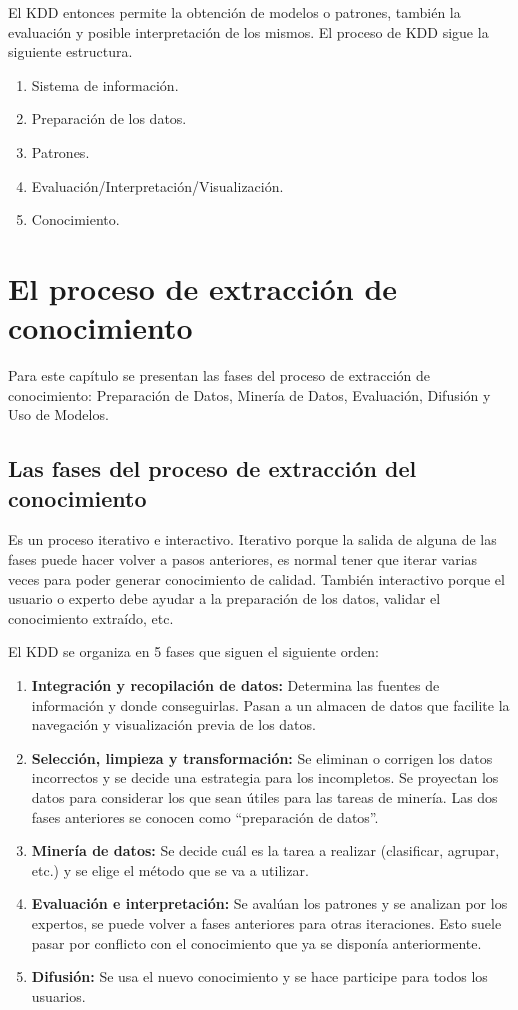 \documentclass{article}
\begin{document}
El KDD entonces permite la obtención de modelos o patrones, también la
evaluación y posible interpretación de los mismos. El proceso de KDD sigue la
siguiente
estructura.

\begin{enumerate}
  \item Sistema de información.
  \item Preparación de los datos.
  \item Patrones.
  \item Evaluación/Interpretación/Visualización.
  \item Conocimiento.
\end{enumerate}

\newpage

\section{El proceso de extracción de conocimiento}
Para este capítulo se presentan las fases del proceso de extracción de conocimiento: Preparación de Datos, Minería de Datos, Evaluación, Difusión y Uso de Modelos.

\subsection{Las fases del proceso de extracción del conocimiento}

Es un proceso iterativo e interactivo. Iterativo porque la salida de alguna de las fases puede hacer volver a pasos anteriores, es normal tener que iterar varias veces para poder generar conocimiento de calidad. También interactivo porque el usuario o experto debe ayudar a la preparación de los datos, validar el conocimiento extraído, etc.

El KDD se organiza en 5 fases que siguen el siguiente orden:
\begin{enumerate}
  \item \textbf{Integración y recopilación de datos:} Determina las fuentes de información y donde conseguirlas. Pasan a un almacen de datos que facilite la navegación y visualización previa de los datos.
  \item \textbf{Selección, limpieza y transformación:} Se eliminan o corrigen los datos incorrectos y se decide una estrategia para los incompletos. Se proyectan los datos para considerar los que sean útiles para las tareas de minería. Las dos fases anteriores se conocen como ``preparación de datos''.
  \item \textbf{Minería de datos:} Se decide cuál es la tarea a realizar (clasificar, agrupar, etc.) y se elige el método que se va a utilizar.
  \item \textbf{Evaluación e interpretación:} Se avalúan los patrones y se analizan por los expertos, se puede volver a fases anteriores para otras iteraciones. Esto suele pasar por conflicto con el conocimiento que ya se disponía anteriormente.
  \item \textbf{Difusión:} Se usa el nuevo conocimiento y se hace participe para todos los usuarios.
\end{enumerate}
\end{document}
